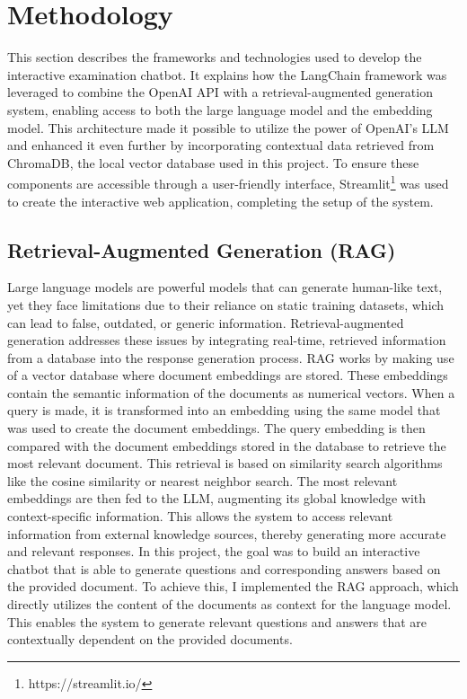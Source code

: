 \documentclass{article}
\begin{document}
\section{Methodology}
This section describes the frameworks and technologies used to develop the interactive examination chatbot. It explains how the LangChain framework was leveraged to combine the OpenAI API with a retrieval-augmented generation system, enabling access to both the large language model and the embedding model. This architecture made it possible to utilize the power of OpenAI's LLM and enhanced it even further by incorporating contextual data retrieved from ChromaDB, the local vector database used in this project. To ensure these components are accessible through a user-friendly interface, Streamlit\footnote{https://streamlit.io/} was used to create the interactive web application, completing the setup of the system.
\subsection{Retrieval-Augmented Generation (RAG)}
Large language models are powerful models that can generate human-like text, yet they face limitations due to their reliance on static training datasets, which can lead to false, outdated, or generic information. Retrieval-augmented generation addresses these issues by integrating real-time, retrieved information from a database into the response generation process. RAG works by making use of a vector database where document embeddings are stored. These embeddings contain the semantic information of the documents as numerical vectors. When a query is made, it is transformed into an embedding using the same model that was used to create the document embeddings. The query embedding is then compared with the document embeddings stored in the database to retrieve the most relevant document. This retrieval is based on similarity search algorithms like the cosine similarity or nearest neighbor search. The most relevant embeddings are then fed to the LLM, augmenting its global knowledge with context-specific information. This allows the system to access relevant information from external knowledge sources, thereby generating more accurate and relevant responses.
\newline
In this project, the goal was to build an interactive chatbot that is able to generate questions and corresponding answers based on the provided document. To achieve this, I implemented the RAG approach, which directly utilizes the content of the documents as context for the language model. This enables the system to generate relevant questions and answers that are contextually dependent on the provided documents.
\end{document}
